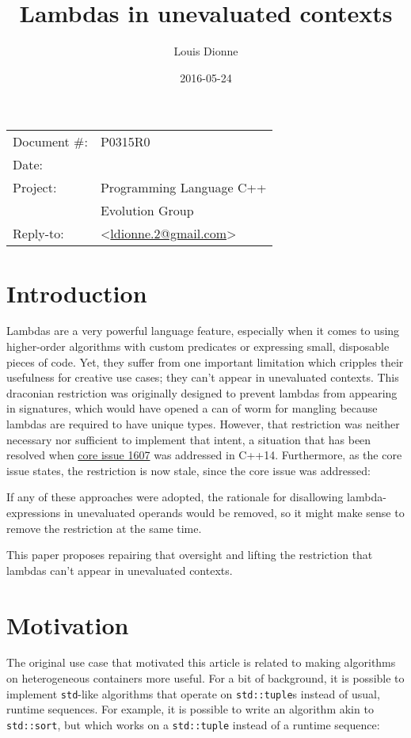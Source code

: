 \documentclass[11pt]{article}
\date{}
\title{Lambdas in unevaluated contexts}
\newcommand{\cc}[1]{\texttt{#1}}
\begin{document}
\maketitle\vspace{-2cm}

\begin{flushright}
  \begin{tabular}{ll}
  Document \#:&P0315R0\\
  Date:       &\date{2016-05-24}\\
  Project:    &Programming Language C++\\
              &Evolution Group\\
  Reply-to:   &\author{Louis Dionne} \textless\href{mailto:ldionne.2@gmail.com}{ldionne.2@gmail.com}\textgreater
  \end{tabular}
\end{flushright}


\section{Introduction}
Lambdas are a very powerful language feature, especially when it comes to using
higher-order algorithms with custom predicates or expressing small, disposable
pieces of code. Yet, they suffer from one important limitation which cripples their
usefulness for creative use cases; they can't appear in unevaluated contexts. This
draconian restriction was originally designed to prevent lambdas from appearing in
signatures, which would have opened a can of worm for mangling because lambdas are
required to have unique types. However, that restriction was neither necessary nor
sufficient to implement that intent, a situation that has been resolved when
\href{http://goo.gl/rJey8q}{core issue 1607} was addressed in C++14. Furthermore,
as the core issue states, the restriction is now stale, since the core issue was
addressed:

\begin{displayquote}
If any of these approaches were adopted, the rationale for disallowing lambda-expressions
in unevaluated operands would be removed, so it might make sense to remove the restriction
at the same time.
\end{displayquote}

This paper proposes repairing that oversight and lifting the restriction that lambdas
can't appear in unevaluated contexts.


\section{Motivation}
The original use case that motivated this article is related to making algorithms
on heterogeneous containers more useful. For a bit of background, it is possible
to implement \cc{std}-like algorithms that operate on \cc{std::tuple}s instead of
usual, runtime sequences. For example, it is possible to write an algorithm akin
to \cc{std::sort}, but which works on a \cc{std::tuple} instead of a runtime
sequence:
\end{document}
